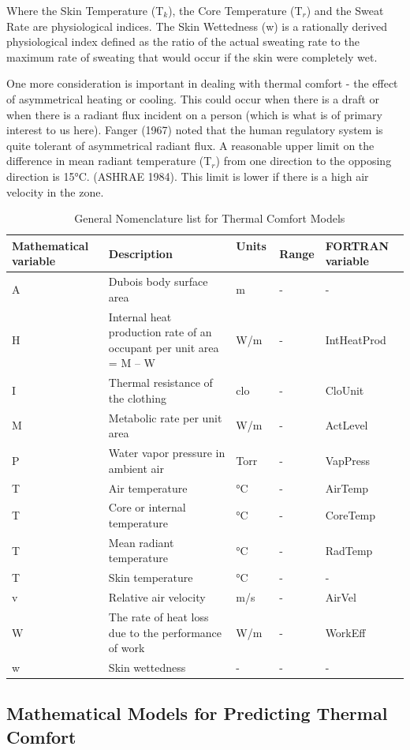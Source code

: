 Where the Skin Temperature (T\(_{k}\)), the Core Temperature (T\(_{r}\)) and the Sweat Rate are physiological indices. The Skin Wettedness (w) is a rationally derived physiological index defined as the ratio of the actual sweating rate to the maximum rate of sweating that would occur if the skin were completely wet.

One more consideration is important in dealing with thermal comfort - the effect of asymmetrical heating or cooling. This could occur when there is a draft or when there is a radiant flux incident on a person (which is what is of primary interest to us here). Fanger (1967) noted that the human regulatory system is quite tolerant of asymmetrical radiant flux. A reasonable upper limit on the difference in mean radiant temperature (T\(_{r}\)) from one direction to the opposing direction is 15°C. (ASHRAE 1984). This limit is lower if there is a high air velocity in the zone.

\begin{longtable}[c]{p{1.2in}p{1.2in}p{1.2in}p{1.2in}p{1.2in}}
\caption{  General Nomenclature list for Thermal Comfort Models \protect \label{table:general-nomenclature-list-for-thermal-comfort}}\\
\toprule 
Mathematical variable & Description & Units ~ & Range & FORTRAN variable \tabularnewline \midrule
\endhead
A & Dubois body surface area & m & - & - \tabularnewline
H & Internal heat production rate of an occupant per unit area = M – W & W/m & - & IntHeatProd \tabularnewline
I & Thermal resistance of the clothing & clo & - & CloUnit \tabularnewline
M & Metabolic rate per unit area & W/m & - & ActLevel \tabularnewline
P & Water vapor pressure in ambient air & Torr & - & VapPress \tabularnewline
T & Air temperature & °C & - & AirTemp \tabularnewline
T & Core or internal temperature & °C & - & CoreTemp \tabularnewline
T & Mean radiant temperature & °C & - & RadTemp \tabularnewline
T & Skin temperature & °C & - & - \tabularnewline
v & Relative air velocity & m/s & - & AirVel \tabularnewline
W & The rate of heat loss due to the performance of work & W/m & - & WorkEff \tabularnewline
w & Skin wettedness & - & - & - \tabularnewline
\bottomrule
\end{longtable}

\subsection{Mathematical Models for Predicting Thermal Comfort}\label{mathematical-models-for-predicting-thermal-comfort}

